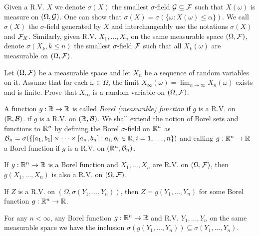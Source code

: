 \begin{definition*}
Given a R.V. $X$ we denote $\sigma(X)$ the smallest $\sigma$-field $\mathcal{G} \subseteq
\mathcal{F}$ such that $X(\omega)$ is measure on $(\Omega, \mathcal{G})$. One can show that
$\sigma(X) = \sigma(\{\omega: X(\omega) \le \alpha\})$. We call $\sigma(X)$ the
$\sigma$-field generated by $X$ and interchangeably use the notations
$\sigma(X)$ and $\mathcal{F}_X$. Similarly, given R.V. $X_1, \dots, X_n$ on the same
measurable space $(\Omega, \mathcal{F})$, denote $\sigma(X_k, k \le n)$ the smallest
$\sigma$-field $\mathcal{F}$ such that all $X_k(\omega)$ are measurable on $(\Omega,
\mathcal{F})$.
\end{definition*} 

\begin{exercise*} 
Let $(\Omega, \mathcal{F})$ be a measurable space and let $X_n$ be a sequence of random
variables on it. Assume that for each $\omega \in \Omega$, the limit $X_\infty
(\omega) = \lim_{n\rightarrow \infty} X_n(\omega)$ exists and is finite. Prove
that $X_\infty$ is a random variable on $(\Omega, \mathcal{F})$.
\end{exercise*} 

\begin{definition*} 
A function $g: \mathbb{R} \rightarrow \mathbb{R}$ is called \emph{Borel (measurable) function}
if $g$ is a R.V. on $(\mathbb{R}, \mathcal{B})$. if $g$ is a R.V. on $(\mathbb{R}, \mathcal{B})$. We shall extend
the notion of Borel sets and functions to $\mathbb{R}^n$ by defining the Borel
$\sigma$-field on $\mathbb{R}^n$ as $\mathcal{B}_n = \sigma(\{[a_1, b_1] \times \cdots \times
[a_n, b_n] : a_i, b_i \in \mathbb{R}, i = 1, \dots, n\})$ and calling $g: \mathbb{R}^n
\rightarrow \mathbb{R}$ a Borel function if $g$ is a R.V. on $(\mathbb{R}^n, \mathcal{B}_n)$.
\end{definition*} 

\begin{proposition*} 
If $g: \mathbb{R}^n \rightarrow \mathbb{R}$ is a Borel function and $X_1, \dots, X_n$ are R.V.
on $(\Omega, \mathcal{F})$, then $g(X_1, \dots, X_n)$ is also a R.V. on $(\Omega, \mathcal{F})$.
\end{proposition*} 

\begin{theorem*} 
If $Z$ is a R.V. on $(\Omega, \sigma(Y_1, \dots, Y_n))$, then $Z = g(Y_1, \dots,
Y_n)$ for some Borel function $g: \mathbb{R}^n \rightarrow \mathbb{R}$.
\end{theorem*} 

\begin{proposition*} 
For any $n < \infty$, any Borel function $g: \mathbb{R}^n \rightarrow \mathbb{R}$ and R.V. $Y_1,
\dots, Y_n$ on the same measurable space we have the inclusion
$\sigma(g(Y_1, \dots, Y_n)) \subseteq \sigma(Y_1, \dots, Y_n)$.
\end{proposition*} 

